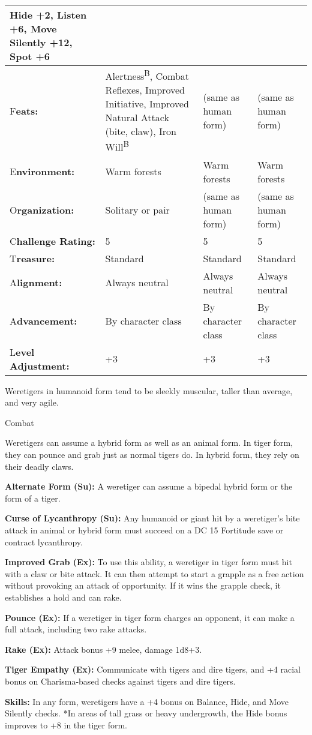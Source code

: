 \documentclass{article}
\begin{document}
\begin{tabular}{|>{\raggedright}p{67pt}|>{\raggedright}p{78pt}|>{\raggedright}p{78pt}|>{\raggedright}p{78pt}|}
Hide +2, Listen +6, Move Silently +12, Spot +6\tabularnewline
\hline
F\textbf{eats:} & Alertness\textsuperscript{B}, Combat Reflexes, Improved Initiative, 
Improved Natural Attack (bite, claw), Iron Will\textsuperscript{B} & (same as human 
form) & (same as human form)\tabularnewline
\hline
E\textbf{nvironment:} & Warm forests & Warm forests & Warm forests\tabularnewline
\hline
O\textbf{rganization:} & Solitary or pair & (same as human form) & (same as human 
form)\tabularnewline
\hline
C\textbf{hallenge Rating:} & 5 & 5 & 5\tabularnewline
\hline
T\textbf{reasure:} & Standard & Standard & Standard\tabularnewline
\hline
A\textbf{lignment:} & Always neutral & Always neutral & Always neutral\tabularnewline
\hline
A\textbf{dvancement:} & By character class & By character class & By character 
class\tabularnewline
\hline
L\textbf{evel Adjustment:} & +3 & +3 & +3\tabularnewline
\hline
\end{tabular}

Weretigers in humanoid form tend to be sleekly muscular, taller than average, and 
very agile. 

Combat

Weretigers can assume a hybrid form as well as an animal form. In tiger form, they 
can pounce and grab just as normal tigers do. In hybrid form, they rely on their 
deadly claws.

\textbf{Alternate Form (Su):} A weretiger can assume a bipedal hybrid form or the 
form of a tiger.

\textbf{Curse of Lycanthropy (Su):} Any humanoid or giant hit by a weretiger's 
bite attack in animal or hybrid form must succeed on a DC 15 Fortitude save or 
contract lycanthropy.

\textbf{Improved Grab (Ex):} To use this ability, a weretiger in tiger form must 
hit with a claw or bite attack. It can then attempt to start a grapple as a free 
action without provoking an attack of opportunity. If it wins the grapple check, 
it establishes a hold and can rake.

\textbf{Pounce (Ex): }If a weretiger in tiger form charges an opponent, it can 
make a full attack, including two rake attacks.

\textbf{Rake (Ex):} Attack bonus +9 melee, damage 1d8+3. 

\textbf{Tiger Empathy (Ex): }Communicate with tigers and dire tigers, and +4 racial 
bonus on Charisma-based checks against tigers and dire tigers.

\textbf{Skills:} In any form, weretigers have a +4 bonus on Balance, Hide, and 
Move Silently checks. *In areas of tall grass or heavy undergrowth, the Hide bonus 
improves to +8 in the tiger form.
\end{document}
